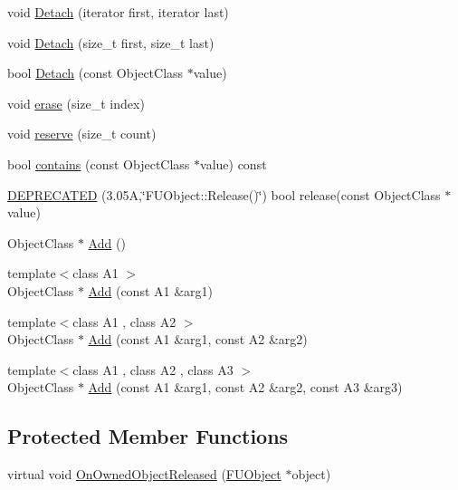 \begin{DoxyCompactItemize}
\item 
void \hyperlink{classFUObjectContainer_acdd17688a17e2d2719cae789a5baf52f}{Detach} (iterator first, iterator last)
\item 
void \hyperlink{classFUObjectContainer_a9a337a5fd58808ae6133e2bba7e3fccf}{Detach} (size\_\-t first, size\_\-t last)
\item 
bool \hyperlink{classFUObjectContainer_a0ec6311406a55d9c5764fd433797fe8a}{Detach} (const ObjectClass $\ast$value)
\item 
void \hyperlink{classFUObjectContainer_a40f942b5f10e64778f5fd2e7b3ad69e6}{erase} (size\_\-t index)
\item 
void \hyperlink{classFUObjectContainer_a5b23781486e11fb4a42f3d58f4090c11}{reserve} (size\_\-t count)
\item 
bool \hyperlink{classFUObjectContainer_abbdf9da16c7fb4e65ea1e3c0d63dc4e8}{contains} (const ObjectClass $\ast$value) const 
\item 
\hyperlink{classFUObjectContainer_aa84fe4da7ea1e0440632e76f3c81ad19}{DEPRECATED} (3.05A,\char`\"{}FUObject::Release()\char`\"{}) bool release(const ObjectClass $\ast$value)
\item 
ObjectClass $\ast$ \hyperlink{classFUObjectContainer_a6f55ac27fc3ee7ce312405392a061a2c}{Add} ()
\item 
{\footnotesize template$<$class A1 $>$ }\\ObjectClass $\ast$ \hyperlink{classFUObjectContainer_a3e8cb0c8385944bffc86edb9211bc6c5}{Add} (const A1 \&arg1)
\item 
{\footnotesize template$<$class A1 , class A2 $>$ }\\ObjectClass $\ast$ \hyperlink{classFUObjectContainer_ae28150f3cdd2fb436abb24d7f53d3ef8}{Add} (const A1 \&arg1, const A2 \&arg2)
\item 
{\footnotesize template$<$class A1 , class A2 , class A3 $>$ }\\ObjectClass $\ast$ \hyperlink{classFUObjectContainer_afc882af5ef9f135c20d6cef1d3e9dc22}{Add} (const A1 \&arg1, const A2 \&arg2, const A3 \&arg3)
\end{DoxyCompactItemize}
\subsection*{Protected Member Functions}
\begin{DoxyCompactItemize}
\item 
virtual void \hyperlink{classFUObjectContainer_ac2ab4f1342e3c49e41362a4024fe411b}{OnOwnedObjectReleased} (\hyperlink{classFUObject}{FUObject} $\ast$object)
\end{DoxyCompactItemize}



